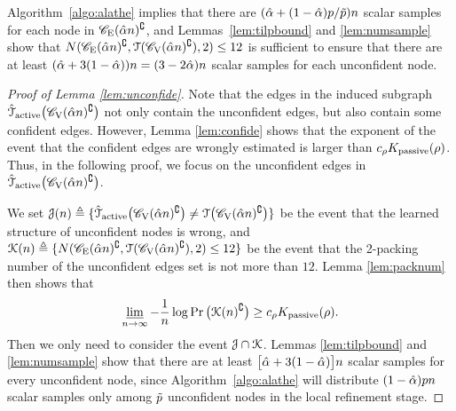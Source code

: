 \begin{remark}
	 Algorithm~\ref{algo:alathe} implies that there are $(\hat{\alpha}+(1-\hat{\alpha})p/\tilde{p})n$ scalar samples for each node in $\mathscr{C}_{\mathrm{E}}(\hat{\alpha} n)^{\complement}$, and Lemmas~\ref{lem:tilpbound} and \ref{lem:numsample} show that $N(\mathscr{C}_{\mathrm{E}}(\hat{\alpha} n)^{\complement},\mathcal{T}(\mathscr{C}_{\mathrm{V}}(\hat{\alpha} n)^{\complement}),2)\leq 12$ is sufficient to ensure that there are at least $(\hat{\alpha}+3(1-\hat{\alpha}))n=(3-2\hat{\alpha})n$ scalar samples for each unconfident node.
\end{remark}
\begin{proof}[Proof of Lemma \ref{lem:unconfide}]
	Note that the edges in the induced subgraph $\hat{\mathcal{T}}_{{\rm active}}\big(\mathscr{C}_{\mathrm{V}}(\hat{\alpha} n)^{\complement}\big)$ not only contain the unconfident edges, but also contain some confident edges. However, Lemma \ref{lem:confide} shows that the exponent of the event that the confident edges are wrongly estimated is larger than $c_{\rho}K _{{\rm passive}}(\rho)$. Thus, in the following proof, we focus on the unconfident edges in $\hat{\mathcal{T}}_{{\rm active}}\big(\mathscr{C}_{\mathrm{V}}(\hat{\alpha} n)^{\complement}\big)$.
	
	We set $\mathcal{J}(n)\triangleq\{\hat{\mathcal{T}}_{{\rm active}}\big(\mathscr{C}_{\mathrm{V}}(\hat{\alpha} n)^{\complement}\big)\neq \mathcal{T}\big(\mathscr{C}_{\mathrm{V}}(\hat{\alpha} n)^{\complement}\big)\}$ be the event that the learned structure of unconfident nodes is wrong, and $\mathcal{K}(n)\triangleq\{N(\mathscr{C}_{\mathrm{E}}(\hat{\alpha} n)^{\complement},\mathcal{T}(\mathscr{C}_{\mathrm{V}}(\hat{\alpha} n)^{\complement}),2)\leq 12\}$ be 
	the event that the 2-packing number of the unconfident edges set is not more than  $12$. Lemma \ref{lem:packnum} then shows that 
	\begin{align}
		\varliminf_{n\rightarrow\infty}-\frac{1}{n}\log\Pr\big(\mathcal{K}(n)^{\complement}\big)\geq c_{\rho}K _{{\rm passive}}(\rho).
	\end{align}
	Then we only need to consider the event $\mathcal{J}\cap \mathcal{K}$. Lemmas \ref{lem:tilpbound} and \ref{lem:numsample} show that there are at least $\big[\hat{\alpha}+3(1-\hat{\alpha})\big]n$ scalar samples for every unconfident node, since Algorithm~\ref{algo:alathe} will distribute $(1-\hat{\alpha})pn$ scalar samples only among $\tilde{p}$ unconfident nodes in the local refinement stage. 


\end{proof}
